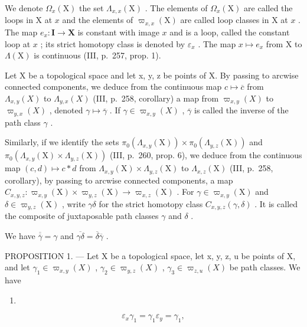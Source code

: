 We denote \(\Omega_x(\mathrm{X})\) the set \(\Lambda_{x,x}(\mathrm{X})\) . The elements of \(\Omega_x(\mathrm{X})\) are called the loops in X at \(x\) and the elements of \(\varpi_{x,x}(\mathrm{X})\) are called loop classes in X at \(x\) . The map \(e_x: \mathbf{I} \to \mathbf{X}\) is constant with image \(x\) and is a loop, called the constant loop at \(x\) ; its strict homotopy class is denoted by \(\varepsilon_x\) . The map \(x \mapsto e_x\) from X to \(\Lambda(\mathrm{X})\) is continuous (III, p.~257, prop. 1).

Let X be a topological space and let x, y, z be points of X. By passing to arcwise connected components, we deduce from the continuous map \(c \mapsto \overline{c}\) from \(\Lambda_{x,y}(X)\) to \(\Lambda_{y,x}(X)\) (III, p.~258, corollary) a map from \(\varpi_{x,y}(X)\) to \(\varpi_{y,x}(X)\) , denoted \(\gamma \mapsto \overline{\gamma}\) . If \(\gamma \in \varpi_{x,y}(X)\) , \(\overline{\gamma}\) is called the inverse of the path class \(\gamma\) .

Similarly, if we identify the sets \(\pi_0(\Lambda_{x,y}(\mathrm{X})) \times \pi_0(\Lambda_{y,z}(\mathrm{X}))\) and \(\pi_0(\Lambda_{x,y}(\mathrm{X}) \times \Lambda_{y,z}(\mathrm{X}))\) (III, p.~260, prop. 6), we deduce from the continuous map \((c,d) \mapsto c * d\) from \(\Lambda_{x,y}(\mathrm{X}) \times \Lambda_{y,z}(\mathrm{X})\) to \(\Lambda_{x,z}(\mathrm{X})\) (III, p.~258, corollary), by passing to arcwise connected components, a map \(C_{x,y,z} \colon \varpi_{x,y}(\mathrm{X}) \times \varpi_{y,z}(\mathrm{X}) \to \varpi_{x,z}(\mathrm{X})\) . For \(\gamma \in \varpi_{x,y}(\mathrm{X})\) and \(\delta \in \varpi_{y,z}(\mathrm{X})\) , write \(\gamma \delta\) for the strict homotopy class \(C_{x,y,z}(\gamma,\delta)\) . It is called the composite of juxtaposable path classes \(\gamma\) and \(\delta\) .

We have \(\overline{\overline{\gamma}}=\gamma\) and \(\overline{\gamma\delta}=\overline{\delta}\overline{\gamma}\) .

PROPOSITION 1. --- Let X be a topological space, let x, y, z, u be points of X, and let \(\gamma_{1} \in \varpi_{x,y}(X)\) , \(\gamma_{2} \in \varpi_{y,z}(X)\) , \(\gamma_{3} \in \varpi_{z,u}(X)\) be path classes. We have

\begin{enumerate}
\def\labelenumi{(\arabic{enumi})}
\tightlist
\item
\end{enumerate}

\[
\varepsilon_ {x} \gamma_ {1} = \gamma_ {1} \varepsilon_ {y} = \gamma_ {1},\tag{2}
\]

